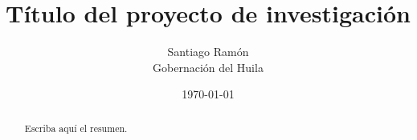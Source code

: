 \documentclass[12pt,letterpaper]{article}
\title{Título del proyecto de investigación}
\author{Santiago Ramón\\Gobernación del Huila}
\date{\today}
\begin{document}
\maketitle

\begin{abstract}
Escriba aquí el resumen.
\end{abstract}

\tableofcontents
\newpage









\end{document}
